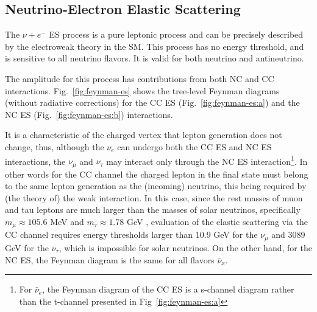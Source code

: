 \subsection{Neutrino-Electron Elastic Scattering}\label{sect:NuEStheory}
The $\nu+e^-$ ES process is a pure leptonic process and can be precisely described by the electroweak theory in the SM. This process has no energy threshold, and is sensitive to all neutrino flavors. It is valid for both neutrino and antineutrino.

The amplitude for this process has contributions from both NC and CC interactions. Fig.~\ref{fig:feynman-es} shows the tree-level Feynman diagrams (without radiative corrections) for the CC ES (Fig.~\ref{fig:feynman-es:a}) and the NC ES (Fig.~\ref{fig:feynman-es:b}) interactions. 

It is a characteristic of the charged vertex that lepton generation does not change, thus, although the $\nu_e$ can undergo both the CC ES and NC ES interactions, the $\nu_{\mu}$ and $\nu_\tau$ may interact only through the NC ES interaction\footnote{For $\bar{\nu}_e$, the Feynman diagram of the CC ES is a s-channel diagram rather than the t-channel presented in Fig~\ref{fig:feynman-es:a}}. In other words for the CC channel the charged lepton in the final state must belong to the same lepton generation as the (incoming) neutrino, this being required by (the theory of) the weak interaction. In this case, since the rest masses of muon and tau leptons are much larger than the masses of solar neutrinos, specifically $m_\mu\approx 105.6$ MeV and $m_\tau\approx 1.78$ GeV \cite{pdg2020}, evaluation of the elastic scattering via the CC channel requires energy thresholds larger than 10.9 GeV for the $\nu_\mu$ and 3089 GeV for the $\nu_\tau$, which is impossible for solar neutrinos. On the other hand, for the NC ES, the Feynman diagram is the same for all flavors $\bar{\nu}_x$\cite{giunti2007fundamentals,xing2011neutrinos}. 

